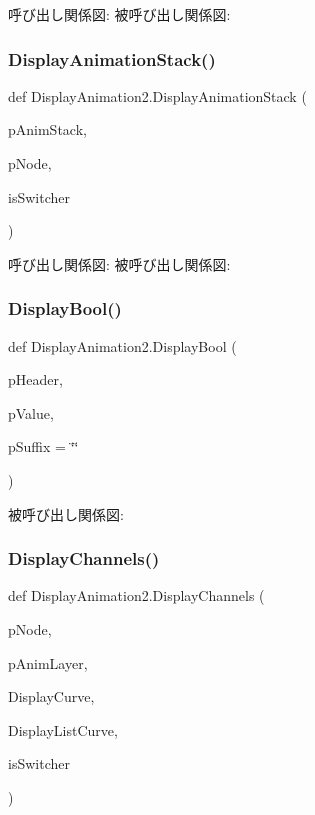呼び出し関係図\+:
被呼び出し関係図\+:
\mbox{\label{namespace_display_animation2_ad815732d177f54a16c36204ce2999fdd}} 
\subsubsection{\texorpdfstring{Display\+Animation\+Stack()}{DisplayAnimationStack()}}
{\footnotesize\ttfamily def Display\+Animation2.\+Display\+Animation\+Stack (\begin{DoxyParamCaption}\item[{}]{p\+Anim\+Stack,  }\item[{}]{p\+Node,  }\item[{}]{is\+Switcher }\end{DoxyParamCaption})}

呼び出し関係図\+:
被呼び出し関係図\+:
\mbox{\label{namespace_display_animation2_a68813e172bc7b686ec28958227464f4c}} 
\subsubsection{\texorpdfstring{Display\+Bool()}{DisplayBool()}}
{\footnotesize\ttfamily def Display\+Animation2.\+Display\+Bool (\begin{DoxyParamCaption}\item[{}]{p\+Header,  }\item[{}]{p\+Value,  }\item[{}]{p\+Suffix = {\ttfamily \char`\"{}\char`\"{}} }\end{DoxyParamCaption})}

被呼び出し関係図\+:
\mbox{\label{namespace_display_animation2_a5d4a4f3638af7347010f27ba9d6a5320}} 
\subsubsection{\texorpdfstring{Display\+Channels()}{DisplayChannels()}}
{\footnotesize\ttfamily def Display\+Animation2.\+Display\+Channels (\begin{DoxyParamCaption}\item[{}]{p\+Node,  }\item[{}]{p\+Anim\+Layer,  }\item[{}]{Display\+Curve,  }\item[{}]{Display\+List\+Curve,  }\item[{}]{is\+Switcher }\end{DoxyParamCaption})}


